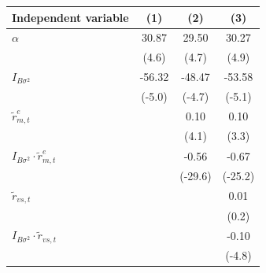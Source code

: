 \begin{tabular}{lccc}
\toprule
Independent variable & (1) & (2) & (3) \\
\midrule
$\alpha$ & 30.87 & 29.50 & 30.27 \\
 & (4.6) & (4.7) & (4.9) \\
$I_{B\sigma^2}$ & -56.32 & -48.47 & -53.58 \\
 & (-5.0) & (-4.7) & (-5.1) \\
$\tilde{r}_{m,t}^e$ &  & 0.10 & 0.10 \\
 &  & (4.1) & (3.3) \\
$I_{B\sigma^2}\cdot \tilde{r}_{m,t}^e$ &  & -0.56 & -0.67 \\
 &  & (-29.6) & (-25.2) \\
$\tilde{r}_{vs,t}$ &  &  & 0.01 \\
 &  &  & (0.2) \\
$I_{B\sigma^2}\cdot \tilde{r}_{vs,t}$ &  &  & -0.10 \\
 &  &  & (-4.8) \\
\bottomrule
\end{tabular}
